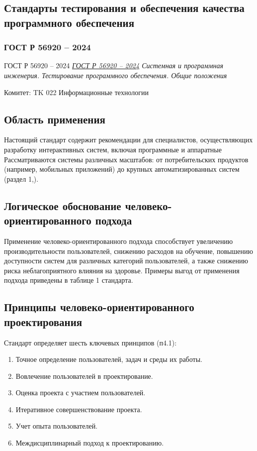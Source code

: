 \usepackage{hyperref}
\subsection{Стандарты тестирования и обеспечения качества программного обеспечения}

\subsubsection{ГОСТ Р 56920 -- 2024}

ГОСТ Р 56920 -- 2024
\emph{\href{https://allgosts.ru/35/080/gost_r_56920-2024.pdf}{ГОСТ Р 56920 -- 2024}
Системная и программная инженерия. Тестирование программного обеспечения. Общие положения
}
\par
Комитет: TK 022 Информационные технологии


\subsection*{Область применения}
Настоящий стандарт содержит рекомендации для специалистов, осуществляющих разработку интерактивных систем, включая программные и аппаратные
Рассматриваются системы различных масштабов: от потребительских продуктов (например, мобильных приложений) до крупных автоматизированных систем (раздел 1,).

\subsection*{Логическое обоснование человеко-ориентированного подхода}
Применение человеко-ориентированного подхода способствует увеличению производительности пользователей, снижению расходов
на обучение, повышению доступности систем для различных категорий пользователей, а также снижению риска неблагоприятного влияния на здоровье.
Примеры выгод от применения подхода приведены в таблице 1 стандарта.

\subsection*{Принципы человеко-ориентированного проектирования}
Стандарт определяет шесть ключевых принципов (п4.1):
\begin{enumerate}
    \item Точное определение пользователей, задач и среды их работы.
    \item Вовлечение пользователей в проектирование.
    \item Оценка проекта с участием пользователей.
    \item Итеративное совершенствование проекта.
    \item Учет опыта пользователей.
    \item Междисциплинарный подход к проектированию.
\end{enumerate}

